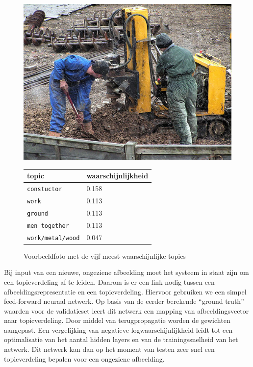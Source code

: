 \begin{figure}[h]
    \centering
    \begin{minipage}[t]{.5\linewidth}
    \centering
    \vspace{0pt}
    \includegraphics[width=\textwidth]{Images/LDA/5402085.jpg}
    \end{minipage}\hfill
    \begin{minipage}[t]{.5\textwidth}
    \centering
    \vspace{0pt}
    \begin{tabular}{ll}
            topic                           & waarschijnlijkheid\\
            \hline
            \texttt{constuctor}             & 0.158 \\
            \texttt{work}                   & 0.113 \\
            \texttt{ground}                 & 0.113 \\
            \texttt{men together}           & 0.113 \\
            \texttt{work/metal/wood}        & 0.047\\
            \hline
        \end{tabular}
    \end{minipage}
    \caption{Voorbeeldfoto met de vijf meest waarschijnlijke topics}
    \label{fig:ldatopics}
\end{figure}




Bij input van een nieuwe, ongeziene afbeelding moet het systeem in staat zijn om een topicverdeling af te leiden. Daarom is er een link nodig tussen een afbeeldingsrepresentatie en een topicverdeling. Hiervoor gebruiken we een simpel feed-forward neuraal netwerk. Op basis van de eerder berekende ``ground truth'' waarden voor de validatieset leert dit netwerk een mapping van afbeeldingsvector naar topicverdeling. Door middel van terugpropagatie worden de gewichten aangepast. Een vergelijking van negatieve logwaarschijnlijkheid leidt tot een optimalisatie van het aantal hidden layers en van de trainingssnelheid van het netwerk. Dit netwerk kan dan op het moment van testen zeer snel een topicverdeling bepalen voor een ongeziene afbeelding.

